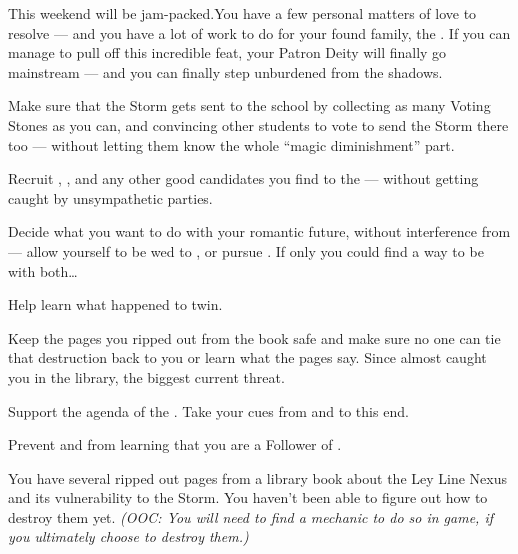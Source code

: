 \documentclass[char]{GL2020}
\begin{document}
This weekend will be jam-packed.You have a few personal matters of love to resolve — and you have a lot of work to do for your found family, the \pGoaties{}. If you can manage to pull off this incredible feat, your Patron Deity will finally go mainstream — and you can finally step unburdened from the shadows.
 
\begin{itemz}
    \item Make sure that the Storm gets sent to the school by collecting as many Voting Stones as you can, and convincing other students to vote to send the Storm there too — without letting them know the whole “magic diminishment” part.
    \item Recruit \cAmbition{}, \cHeir{}, and any other good candidates you find to the \pGoaties{} — without getting caught by unsympathetic parties.
    \item Decide what you want to do with your romantic future, without interference from \cDiplomat{} — allow yourself to be wed to \cHeir{}, or pursue \cPresident{}. If only you could find a way to be with both\ldots{}
    \item Help \cWildCard{} learn what happened to \cWildCard{\their} twin.
\end{itemz}

\begin{itemz}
   \item Keep the pages you ripped out from the book safe and make sure no one can tie that destruction back to you or learn what the pages say. Since \cScholarship{} almost caught you in the library,  \cScholarship{\theyare} the biggest current threat.
    \item Support the agenda of the \pGoaties{}. Take your cues from \cChupLeader{} and \cChupSecond{} to this end.
    \item Prevent \cWildCard{} and \cHistory{} from learning that you are a Follower of \cGenesis{\intro}.
\end{itemz}

\begin{itemz}[Notes]
    \item You have several ripped out pages from a library book about the Ley Line Nexus and its vulnerability to the Storm. You haven’t been able to figure out how to destroy them yet. \emph{(OOC: You will need to find a mechanic to do so in game, if you ultimately choose to destroy them.)}
\end{itemz}
 
\end{document}
